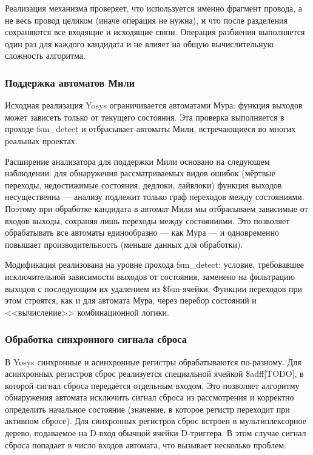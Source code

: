 Реализация механизма проверяет, что используется именно фрагмент провода, а не весь провод целиком
(иначе операция не нужна), и что после разделения сохраняются все входящие и исходящие связи.
Операция разбиения выполняется один раз для каждого кандидата и не влияет на общую вычислительную
сложность алгоритма.

\subsubsection{Поддержка автоматов Мили}

Исходная реализация Yosys ограничивается автоматами Мура: функция выходов может зависеть только
от текущего состояния. Эта проверка выполняется в проходе fsm\_detect и отбрасывает автоматы
Мили, встречающиеся во многих реальных проектах.

Расширение анализатора для поддержки Мили основано на следующем наблюдении: для обнаружения
рассматриваемых видов ошибок (мёртвые переходы, недостижимые состояния, дедлоки, лайвлоки)
функция выходов несущественна — анализу подлежит только граф переходов между состояниями.
Поэтому при обработке кандидата в автомат Мили мы отбрасываем зависимые от входов выходы,
сохраняя лишь переходы между состояниями. Это позволяет обрабатывать все автоматы
единообразно --- как Мура --- и одновременно повышает производительность
(меньше данных для обработки).

Модификация реализована на уровне прохода fsm\_detect: условие, требовавшее исключительной
зависимости выходов от состояния, заменено на фильтрацию выходов с последующим их удалением
из \$fsm-ячейки. Функции переходов при этом строятся, как и для автомата Мура, через перебор
состояний и <<вычисление>> комбинационной логики.

\subsubsection{Обработка синхронного сигнала сброса}

В Yosys синхронные и асинхронные регистры обрабатываются по-разному. Для асинхронных регистров
сброс реализуется специальной ячейкой \$adff[TODO],
в которой сигнал сброса передаётся отдельным входом.
Это позволяет алгоритму обнаружения автомата исключить сигнал сброса из рассмотрения и корректно
определить начальное состояние (значение, в которое регистр переходит при активном сбросе).
Для синхронных регистров сброс встроен в мультиплексорное дерево, подаваемое на D-вход обычной
ячейки D-триггера. В этом случае сигнал сброса попадает в число входов автомата, что вызывает
несколько проблем:

